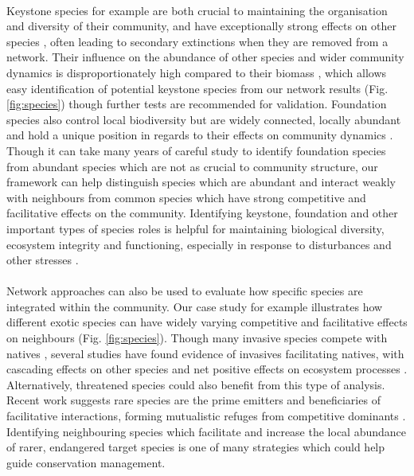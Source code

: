\documentclass[a4,12pt]{article}
\begin{document}
\begin{itemize}
         \paragraph{}
     Keystone species for example are both crucial to maintaining the organisation and diversity of their community, and have exceptionally strong effects on other species \parencite{Mills1993}, often leading to secondary extinctions when they are removed from a network. Their influence on the abundance of other species and wider community dynamics is disproportionately high compared to their biomass \parencite{Power1996, Piraino2002, Libralato2006}, which allows easy identification of potential keystone species from our network results (Fig. \ref{fig:species}) though further tests are recommended for validation. Foundation species also control local biodiversity but are widely connected, locally abundant and hold a unique position in regards to their effects on community dynamics \parencite{Ellison2005, Baiser2013, Ellison2019}. Though it can take many years of careful study to identify foundation species from abundant species which are not as crucial to community structure, our framework can help distinguish species which are abundant and interact weakly with neighbours from common species which have strong competitive and facilitative effects on the community. Identifying keystone, foundation and other important types of species roles is helpful for maintaining biological diversity, ecosystem integrity and functioning, especially in response to disturbances and other stresses \parencite{Nyakatya2008, Orwin2016, Losapio2017, Narwani2019}.

    \paragraph{}
    Network approaches can also be used to evaluate how specific species are integrated within the community. Our case study for example illustrates how different exotic species can have widely varying competitive and facilitative effects on neighbours (Fig. \ref{fig:species}). Though many invasive species compete with natives \parencite{Naeem2000, Riley2008, Zheng2015}, several studies have found evidence of invasives facilitating natives, with cascading effects on other species and net positive effects on ecosystem processes \parencite{Rodriguez2006, Ramus2017}. Alternatively, threatened species could also benefit from this type of analysis. Recent work suggests rare species are the prime emitters and beneficiaries of facilitative interactions, forming mutualistic refuges from competitive dominants \parencite{Calatayud2019, Hines2020}. Identifying neighbouring species which facilitate and increase the local abundance of rarer, endangered target species is one of many strategies which could help guide conservation management.



\end{itemize}
\end{document}
